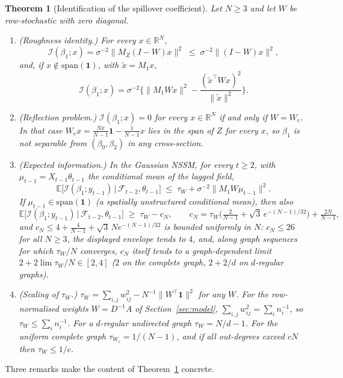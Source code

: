 \documentclass[12pt]{article}
\theoremstyle{plain}
\newtheorem{theorem}{Theorem}
\theoremstyle{definition}
\theoremstyle{remark}
\newcommand{\R}{\mathbb{R}}
\newcommand{\E}{\mathbb{E}}
\newcommand{\one}{\mathbf{1}}
\newcommand{\calF}{\mathcal{F}}
\newcommand{\calI}{\mathcal{I}}
\newcommand{\Wc}{W_{\mathrm{c}}}
\newcommand{\tauW}{\tau_W}
\newcommand{\T}{^{\top}}
\begin{document}
\begin{theorem}[Identification of the spillover coefficient]\label{thm:ident}
Let $N\ge 3$ and let $W$ be row-stochastic with zero diagonal.
\begin{enumerate}[label=(\roman*),leftmargin=*]
\item \textup{(Roughness identity.)} For every $x\in\R^N$,
\[
\calI(\beta_1;x)=\sigma^{-2}\big\|M_Z(I-W)x\big\|^2\;\le\;\sigma^{-2}\big\|(I-W)x\big\|^2 ,
\]
and, if $x\notin\mathrm{span}(\one)$, with $\tilde x=M_1x$,
\[
\calI(\beta_1;x)=\sigma^{-2}\Big\{\|M_1Wx\|^2-\frac{(\tilde x\T Wx)^2}{\|\tilde x\|^2}\Big\}.
\]
\item \textup{(Reflection problem.)} $\calI(\beta_1;x)=0$ for every $x\in\R^N$ if and only if $W=\Wc$. In that case $\Wc x=\frac{N\bar x}{N-1}\one-\frac{1}{N-1}x$ lies in the span of $Z$ for every $x$, so $\beta_1$ is not separable from $(\beta_0,\beta_2)$ in any cross-section.
\item \textup{(Expected information.)} In the Gaussian NSSM, for every $t\ge2$, with $\mu_{t-1}=X_{t-1}\theta_{t-1}$ the conditional mean of the lagged field,
\[
\E\big[\calI(\beta_1;y_{t-1})\,\big|\,\calF_{t-2},\theta_{t-1}\big]\;\le\;\tauW+\sigma^{-2}\|M_1W\mu_{t-1}\|^2 .
\]
If $\mu_{t-1}\in\mathrm{span}(\one)$ \textup{(}a spatially unstructured conditional mean\textup{)}, then also
\[
\E\big[\calI(\beta_1;y_{t-1})\,\big|\,\calF_{t-2},\theta_{t-1}\big]\;\ge\;\tauW-c_N,\qquad
c_N=\tauW\Big(\tfrac{2}{N-1}+\sqrt3\,e^{-(N-1)/32}\Big)+\tfrac{2N}{N-1},
\]
and $c_N\le 4+\frac{4}{N-1}+\sqrt3\,Ne^{-(N-1)/32}$ is bounded uniformly in $N$: $c_N\le26$ for all $N\ge3$, the displayed envelope tends to $4$, and, along graph sequences for which $\tauW/N$ converges, $c_N$ itself tends to a graph-dependent limit $2+2\lim\tauW/N\in[2,4]$ \textup{(}$2$ on the complete graph, $2+2/d$ on $d$-regular graphs\textup{)}.
\item \textup{(Scaling of $\tauW$.)} $\tauW=\sum_{i,j}w_{ij}^2-N^{-1}\|W\T\one\|^2$ for any $W$. For the row-normalised weights $W=D^{-1}A$ of Section~\ref{sec:model}, $\sum_{i,j}w_{ij}^2=\sum_i n_i^{-1}$, so $\tauW\le\sum_i n_i^{-1}$. For a $d$-regular undirected graph $\tauW=N/d-1$. For the uniform complete graph $\tau_{\Wc}=1/(N-1)$, and if all out-degrees exceed $cN$ then $\tauW\le 1/c$.
\end{enumerate}
\end{theorem}

Three remarks make the content of Theorem~\ref{thm:ident} concrete.
\end{document}
